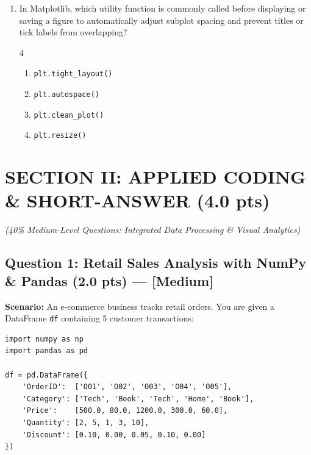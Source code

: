 \documentclass[11pt,a4paper]{article}
\begin{document}
\begin{enumerate}[leftmargin=*,itemsep=2.5pt,resume]
\item In Matplotlib, which utility function is commonly called before displaying or saving a figure to automatically adjust subplot spacing and prevent titles or tick labels from overlapping?
\begin{multicols}{4}
\begin{enumerate}[label=\Alph*.]
  \item \texttt{plt.tight\_layout()}
  \item \texttt{plt.autospace()}
  \item \texttt{plt.clean\_plot()}
  \item \texttt{plt.resize()}
\end{enumerate}
\end{multicols}

\end{enumerate}

\newpage
\section*{SECTION II: APPLIED CODING \& SHORT-ANSWER (4.0 pts)}
\textit{\small (40\% Medium-Level Questions: Integrated Data Processing \& Visual Analytics)}

\subsection*{Question 1: Retail Sales Analysis with NumPy \& Pandas (2.0 pts) --- [Medium]}

\noindent
\textbf{Scenario:} An e-commerce business tracks retail orders. You are given a DataFrame \texttt{df} containing 5 customer transactions:

\begin{lstlisting}
import numpy as np
import pandas as pd

df = pd.DataFrame({
    'OrderID':  ['O01', 'O02', 'O03', 'O04', 'O05'],
    'Category': ['Tech', 'Book', 'Tech', 'Home', 'Book'],
    'Price':    [500.0, 80.0, 1200.0, 300.0, 60.0],
    'Quantity': [2, 5, 1, 3, 10],
    'Discount': [0.10, 0.00, 0.05, 0.10, 0.00]
})
\end{lstlisting}
\end{document}
